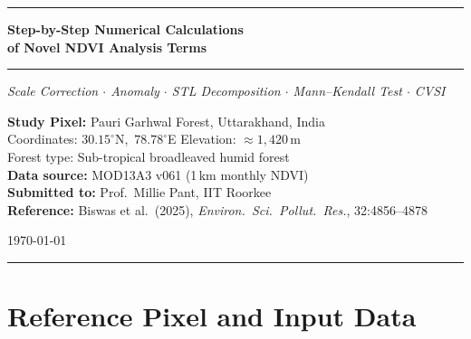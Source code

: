 \documentclass[12pt, a4paper]{article}
\begin{document}

\begin{titlepage}
\centering
\vspace*{1.5cm}
{\color{iitblue}\rule{\linewidth}{1.5pt}}
\vspace{0.4cm}

{\LARGE\bfseries\color{iitblue}
Step-by-Step Numerical Calculations\\[0.4em]
of Novel NDVI Analysis Terms}

\vspace{0.3cm}
{\color{gold}\rule{\linewidth}{1pt}}
\vspace{0.3cm}

{\large\itshape\color{midblue}
Scale Correction $\cdot$ Anomaly $\cdot$
STL Decomposition $\cdot$ Mann--Kendall Test $\cdot$ CVSI}

\vspace{1cm}
\begin{tcolorbox}[enhanced, colback=lightblue, colframe=iitblue, width=0.85\textwidth]
\centering
\textbf{Study Pixel:} Pauri Garhwal Forest, Uttarakhand, India\\[4pt]
Coordinates: $30.15^{\circ}$N,\ $78.78^{\circ}$E \quad
Elevation: $\approx 1{,}420$\,m\\[4pt]
Forest type: Sub-tropical broadleaved humid forest\\[4pt]
\textbf{Data source:} MOD13A3 v061 (1\,km monthly NDVI)\\[6pt]
\textbf{Submitted to:} Prof.\ Millie Pant, IIT Roorkee\\[4pt]
\textbf{Reference:} Biswas et al.\ (2025),
\textit{Environ.\ Sci.\ Pollut.\ Res.}, 32:4856--4878
\end{tcolorbox}

\vspace{0.8cm}
{\large\today}

\vspace{0.5cm}
{\color{iitblue}\rule{\linewidth}{1.5pt}}
\end{titlepage}

\tableofcontents
\clearpage

\section{Reference Pixel and Input Data}
\label{sec:data}
\end{document}
